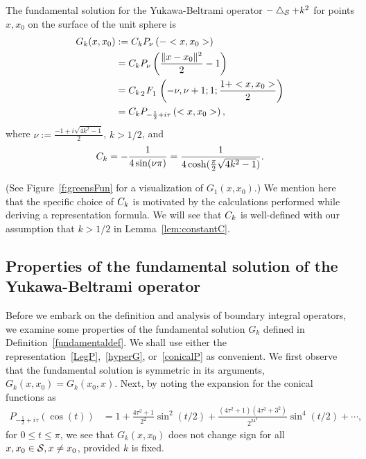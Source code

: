 \begin{definition}
\label{fundamentaldef} 
The fundamental solution for the Yukawa-Beltrami operator $-\lap_\S +
k^2$ for points $x,x_0$ on the surface of the unit sphere is 
\begin{subequations}
  \begin{align}
    G_k(x,x_{0})&:=\C P_{\nu}\left(-<x,x_{0}>\right) \nonumber \\
    &=\C P_{\nu}\left(\frac{\|x-x_{0}\|^2}{2}-1\right) \label{LegP} \\
    &= \C\, \tensor[_2]{F}{_1} \left(-\nu, \nu+1; 1; 
      \frac{1+<x,x_{0}>}{2}\right)\label{hyperG} \\
    &=\C P_{-\frac{1}{2} + i \tau}
    \left(<x,x_{0}>\right) 
    \label{conicalP},
  \end{align} 
\end{subequations}
where 
$\nu:=\frac{-1+i\sqrt{4k^2-1}}{2}$, $k>1/2$, and 
\begin{align}
  \label{constant-definition}    
  \C=-\frac{1}{4\sin(\nu\pi)} 
    =\frac{1}{4\cosh(\frac{\pi}{2}\sqrt{4k^2-1})}.
\end{align}
\end{definition} 
(See Figure~\ref{f:greensFun} for a visualization of $G_1(x,x_0)$.) We
mention here that the specific choice of $\C$ is motivated by the
calculations performed while deriving a representation formula.  We will
see that $\C$ is well-defined with our assumption that $k>1/2$ in
Lemma~\ref{lem:constantC}.


\subsection{Properties of the fundamental solution of the
Yukawa-Beltrami operator}
Before we embark on the definition and analysis of boundary integral
operators, we examine some properties of the fundamental solution $G_k$
defined in Definition~\ref{fundamentaldef}. We shall use either the
representation~\eqref{LegP},~\eqref{hyperG}, or~\eqref{conicalP} as
convenient.  We first observe that the fundamental solution is symmetric
in its arguments, $G_k(x,x_{0}) = G_k(x_{0},x)$. Next, by noting the
expansion for the conical functions as~\cite{lebedev}
\begin{align*}
  P_{-\frac{1}{2}+i \tau} (\cos(t)) &= 1+
    \frac{4\tau^2+1}{2^2}\sin^2(t/2) + 
      \frac{(4\tau^2+1)(4\tau^2+3^2)}{2^24^2}\sin^4(t/2) + 
    \cdots,
\end{align*}
for $0\leq t\leq \pi$, we see that $G_k(x,x_0)$ does not change sign for
  all $x,x_{0} \in \S, x \neq x_{0}$, provided $k$ is fixed.

